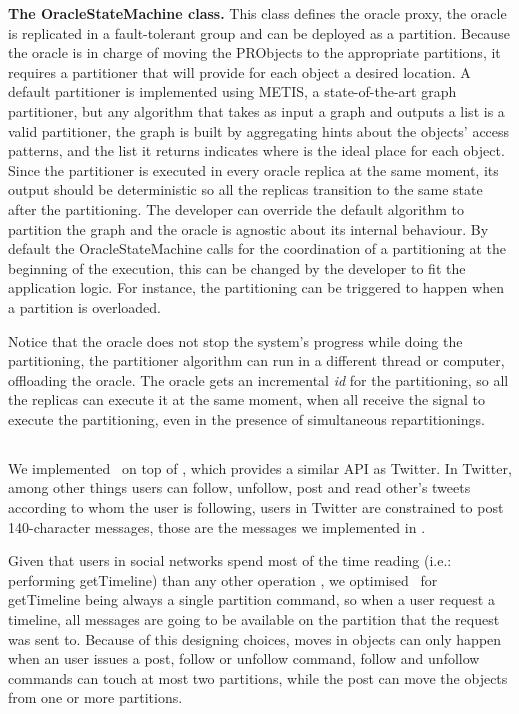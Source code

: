 \textbf{The OracleStateMachine class.} This class defines the oracle proxy, the oracle is replicated in a fault-tolerant
group and can be deployed as a partition. Because the oracle is in charge of moving the PRObjects to the appropriate 
partitions, it requires a partitioner that will provide for each object a desired location. A default partitioner is implemented using METIS, a state-of-the-art graph partitioner, but any algorithm that takes as input a graph and outputs a list is a valid
partitioner, the graph is built by aggregating hints about the objects' access patterns, and the list it returns indicates where
is the ideal place for each object. Since the partitioner is executed in every oracle replica at the same moment,
its output should be deterministic so all the replicas transition to the same state after the partitioning. 
The developer can override the default algorithm to partition the graph and the oracle is agnostic about its internal behaviour.
By default the OracleStateMachine calls for the coordination of a partitioning at the beginning of the execution, this can be
changed by the developer to fit the application logic. For instance, the partitioning can be triggered to 
happen when a partition is overloaded.

Notice that the oracle does not stop the system's progress while doing the partitioning, the partitioner algorithm can
 run in a different thread or computer, offloading the oracle. The oracle gets an incremental \emph{id} for the partitioning, 
 so all the replicas can execute it at the same moment, when all receive the signal to execute the partitioning, 
 even in the presence of simultaneous repartitionings.

\subsection{\appname}

We implemented \appname\ on top of \libname, which provides a similar API as Twitter. In Twitter, among other things
users can follow, unfollow, post and read other's tweets according to whom the user is following, users in Twitter are
constrained to post 140-character messages, those are the messages we implemented in \appname.

Given that users in social networks spend most of the time reading (i.e.: performing getTimeline) than any other operation 
\cite{facebookTAO}, we optimised \appname\ for getTimeline being always a single partition command, so when a
user request a timeline, all messages are going to be available on the partition that the request was sent to.
Because of this designing choices, moves in objects can only happen when an user issues a post, follow or unfollow
command, follow and unfollow commands can touch at most two partitions, while the post can move the objects from
one or more partitions.


